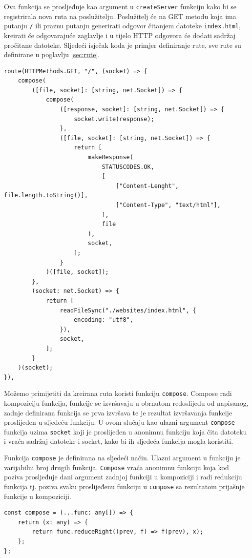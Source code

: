 \documentclass[]{foi} %
\begin{document}
Ova funkcija se prosljeđuje kao argument u \texttt{createServer} funkciju kako bi se
registrirala nova ruta na poslužitelju. Poslužitelj će na GET metodu koja ima putanju
\texttt{/} ili praznu putanju generirati odgovor čitanjem datoteke \texttt{index.html},
kreirati će odgovarajuće zaglavlje i u tijelo HTTP odgovora će dodati sadržaj pročitane
datoteke. Sljedeći isječak koda je primjer definiranje rute, sve rute su definirane u
poglavlju \ref{sec:rute}.
\begin{lstlisting}[caption={Primjer rute}, label=lst:primjer_rute]
route(HTTPMethods.GET, "/", (socket) => {
    compose(
        ([file, socket]: [string, net.Socket]) => {
            compose(
                ([response, socket]: [string, net.Socket]) => {
                    socket.write(response);
                },
                ([file, socket]: [string, net.Socket]) => {
                    return [
                        makeResponse(
                            STATUSCODES.OK,
                            [
                                ["Content-Lenght", file.length.toString()],
                                ["Content-Type", "text/html"],
                            ],
                            file
                        ),
                        socket,
                    ];
                }
            )([file, socket]);
        },
        (socket: net.Socket) => {
            return [
                readFileSync("./websites/index.html", {
                    encoding: "utf8",
                }),
                socket,
            ];
        }
    )(socket);
}),
\end{lstlisting}

Možemo primijetiti da kreirana ruta koristi funkciju \texttt{compose}. Compose radi
kompoziciju funkcija, funkcije se izvršavaju u obrnutom redoslijedu od napisanog,
zadnje definirana funkcija se prva izvršava te je rezultat izvršavanja funkcije
proslijeđen u sljedeću funkciju. U ovom slučaju kao ulazni argument \texttt{compose} funkcija
uzima \texttt{socket} koji je proslijeđen u anonimnu funkciju koja čita datoteku i vraća
sadržaj datoteke i socket, kako bi ih sljedeća funkcija mogla koristiti.

Funkcija \texttt{compose} je definirana na sljedeći način. Ulazni argument u funkciju je
varijabilni broj drugih funkcija. \texttt{Compose} vraća anonimnu funkciju koja kod poziva
prosljeđuje dani argument zadnjoj funkciji u kompoziciji i radi redukciju funkcija tj.
poziva svaku proslijeđenu funkciju u \texttt{compose} sa rezultatom prijašnje funkcije
u kompoziciji.
\begin{lstlisting}[caption={Definicija compose funkcije}, label=lst:compose_funkcija]
const compose = (...func: any[]) => {
    return (x: any) => {
        return func.reduceRight((prev, f) => f(prev), x);
    };
};
\end{lstlisting}
\end{document}
